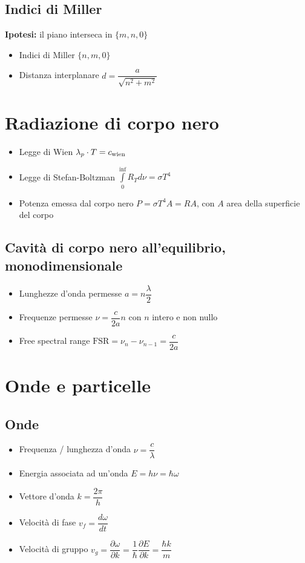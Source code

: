 \documentclass{article}
\begin{document}
\subsection{Indici di Miller}
\textbf{Ipotesi:} il piano interseca in \( \{m, n, 0\} \)
\begin{itemize}
  \item Indici di Miller \( \{n, m, 0\} \)
  \item Distanza interplanare \( d = \dfrac{a}{\sqrt{n^2+m^2}} \)
\end{itemize}

\newpage

\section{Radiazione di corpo nero}
\begin{itemize}
  \item Legge di Wien \( \lambda_{p} \cdot T = c_{\textnormal{wien}} \)
  \item Legge di Stefan-Boltzman \( \displaystyle \int\limits_{0}^{\inf} R_T d \nu = \sigma T ^ 4 \)
  \item Potenza emessa dal corpo nero \( P = \sigma T^4 A = R A \), con \(A\) area della superficie del corpo
\end{itemize}
\subsection{Cavità di corpo nero all'equilibrio, monodimensionale}
\begin{itemize}
  \item Lunghezze d'onda permesse \( a = n \dfrac{\lambda}{2} \)
  \item Frequenze permesse \( \nu = \dfrac{c}{2a} n \) con \( n \) intero e non nullo
  \item Free spectral range \( \text{FSR} = \nu_n - \nu_{n-1} = \dfrac{c}{2a} \)
\end{itemize}

\newpage

\section{Onde e particelle}
\subsection{Onde}
\begin{itemize}
  \item Frequenza / lunghezza d'onda \( \nu = \dfrac{c}{\lambda} \)
  \item Energia associata ad un'onda \( E = h \nu = \hbar \omega \)
  \item Vettore d'onda \( k = \dfrac{2 \pi}{h} \)
  \item Velocità di fase \( v_f = \dfrac{d \omega}{d t}\)
  \item Velocità di gruppo \( v_g = \dfrac{\partial \omega}{\partial k} = \dfrac{1}{\hbar} \dfrac{\partial E}{\partial k} =\dfrac{\hbar k}{m} \)
\end{itemize}
\end{document}
